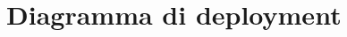 \documentclass[../main.tex]{subfiles}
\begin{document}
\section{Diagramma di deployment}
\figure[H]
\centering

\endfigure
\vfill\newpage
\end{document}
